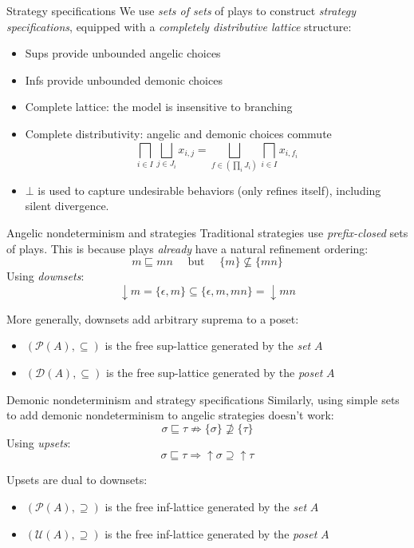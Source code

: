 \documentclass[aspectratio=54]{beamer}
\begin{document}
\begin{frame}{Strategy specifications} %
We use \emph{sets of sets} of plays
to construct \emph{strategy specifications},
equipped with a
\emph{completely distributive lattice}
structure:
\begin{itemize}
  \item Sups provide unbounded angelic choices
  \item Infs provide unbounded demonic choices
  \item Complete lattice: the model is insensitive to branching
  \item Complete distributivity: angelic and demonic choices commute
  \[
      \bigsqcap_{i \in I} \bigsqcup_{j \in J_i} x_{i,j} =
      \bigsqcup_{f \in (\prod_i J_i)} \bigsqcap_{i \in I} x_{i, f_i}
  \]
  \item $\bot$ is used to capture undesirable behaviors (only refines itself),
    including silent divergence.
\end{itemize}
\end{frame}

\begin{frame}{Angelic nondeterminism and strategies} %
  Traditional strategies use
  \emph{prefix-closed} sets of plays.
  This is because plays \emph{already} have
  a natural refinement ordering:
  \[
    m \sqsubseteq mn
    \quad \mbox{ but } \quad
    \{m\} \nsubseteq \{mn\}
  \]
  Using \emph{downsets}:
  \[
    {\downarrow} m = \{\epsilon, m\} \subseteq \{\epsilon, m, mn\} = {\downarrow} mn
  \]

  More generally,
  downsets add arbitrary suprema to a poset:
  \begin{itemize}
    \item $(\mathcal{P}(A), {\subseteq})$ is the
      free sup-lattice generated by the \emph{set} $A$
    \item $(\mathcal{D}(A), {\subseteq})$ is the
      free sup-lattice generated by the \emph{poset} $A$
  \end{itemize}
\end{frame}

\begin{frame}{Demonic nondeterminism and strategy specifications} %
  Similarly,
  using simple sets to add demonic nondeterminism to angelic strategies
  doesn't work:
  \[
    \sigma \sqsubseteq \tau \nRightarrow
    \{\sigma\} \nsupseteq \{\tau\}
  \]
  Using \emph{upsets}:
  \[
    \sigma \sqsubseteq \tau \Rightarrow
    {\uparrow} \sigma \supseteq {\uparrow} \tau
  \]

  Upsets are dual to downsets:
  \begin{itemize}
    \item $(\mathcal{P}(A), {\supseteq})$ is the
      free inf-lattice generated by the \emph{set} $A$
    \item $(\mathcal{U}(A), {\supseteq})$ is the
      free inf-lattice generated by the \emph{poset} $A$
  \end{itemize}
\end{frame}
\end{document}

